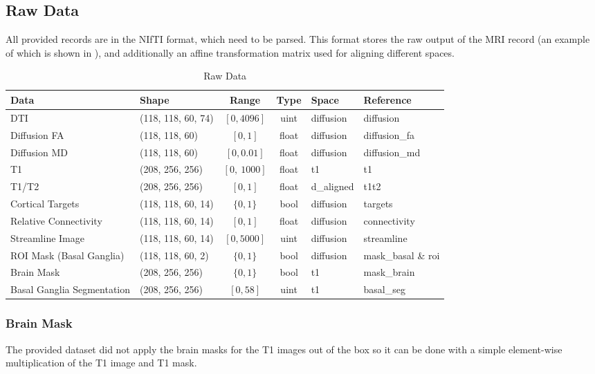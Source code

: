 \subsection{Raw Data}
All provided records are in the \ac{NIfTI} format, which need to be parsed. This format stores the raw output of the \ac{MRI} record (an example of which is shown in ), and additionally an affine transformation matrix used for aligning different spaces.

\begin{table}[H]
\begin{adjustwidth}{-.5in}{-.5in}
\centering
\begin{tabular}[H]{|l|l|c|c|l|l|}
\hline
\textbf{Data} & \textbf{Shape} & \textbf{Range} & \textbf{Type} & \textbf{Space} & \textbf{Reference} \\ \hline
\ac{DTI} & (118, 118, 60, 74) & $[0,4096]$ & uint & diffusion & diffusion \\ \hline
Diffusion \ac{FA} & (118, 118, 60) & $[0,1]$ & float & diffusion & diffusion\_fa \\ \hline
Diffusion \ac{MD} & (118, 118, 60) & $[0,0.01]$ & float & diffusion & diffusion\_md \\ \hline
T1 & (208, 256, 256) & $[0,~1000]$ & float & t1 & t1 \\ \hline
T1/T2 & (208, 256, 256) & $[0,1]$ & float & d\_aligned & t1t2 \\ \hline
Cortical Targets & (118, 118, 60, 14) & $\{0,1\}$ & bool & diffusion & targets \\ \hline
Relative Connectivity & (118, 118, 60, 14) & $[0,1]$ & float & diffusion & connectivity \\ \hline
Streamline Image & (118, 118, 60, 14) & $[0,5000]$ & uint & diffusion & streamline \\ \hline
\ac{ROI} Mask (Basal Ganglia) & (118, 118, 60, 2) & $\{0,1\}$ & bool & diffusion & mask\_basal \& roi \\ \hline
Brain Mask & (208, 256, 256) & $\{0,1\}$ & bool & t1 & mask\_brain \\ \hline
Basal Ganglia Segmentation & (208, 256, 256) & $[0, 58]$ & uint & t1 & basal\_seg \\ \hline
\end{tabular}
\end{adjustwidth}
\caption{Raw Data}
\label{tab:datas1}
\end{table}

\subsubsection{Brain Mask}
The provided dataset did not apply the brain masks for the T1 images out of the box so it can be done with a simple element-wise multiplication of the T1 image and T1 mask.

